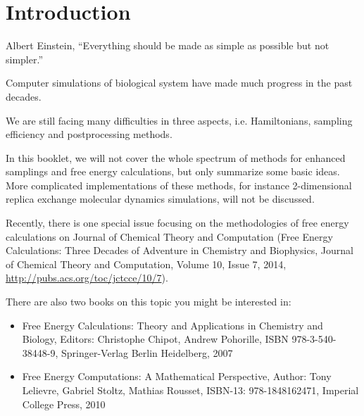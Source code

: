 \chapter{Introduction\label{chapter:introduction}}

\begin{chapquote}{Albert Einstein, %
	}
``Everything should be made as simple as possible but not simpler.''
\end{chapquote}

Computer simulations of biological system have made much progress in the past decades. 

We are still facing many difficulties in three aspects, i.e. Hamiltonians, sampling efficiency and postprocessing methods.\cite{NielsJCTC2014}

In this booklet, we will not cover the whole spectrum of methods for enhanced samplings and free energy calculations, but only summarize some basic ideas. 
More complicated implementations of these methods, for instance 2-dimensional replica exchange molecular dynamics simulations, will not be discussed.

Recently, there is one special issue focusing on the methodologies of free energy calculations on Journal of Chemical Theory and Computation (Free Energy Calculations: Three Decades of Adventure in Chemistry and Biophysics, Journal of Chemical Theory and Computation, Volume 10, Issue 7, 2014, \url{http://pubs.acs.org/toc/jctcce/10/7}). 

There are also two books on this topic you might be interested in:
\begin{itemize}
\item Free Energy Calculations: Theory and Applications in Chemistry and Biology, Editors: Christophe Chipot, Andrew Pohorille, ISBN 978-3-540-38448-9, Springer-Verlag Berlin Heidelberg, 2007
\item Free Energy Computations: A Mathematical Perspective, Author: Tony Lelievre, Gabriel Stoltz, Mathias Rousset, ISBN-13: 978-1848162471, Imperial College Press, 2010
\end{itemize}